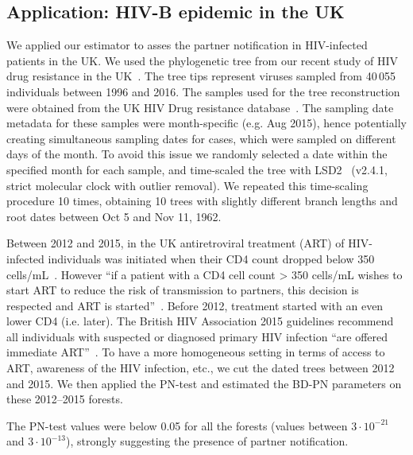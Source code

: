 \documentclass[a4paper,10pt]{article}
\begin{document}
\subsection{Application: HIV-B epidemic in the UK}
We applied our estimator to asses the partner notification in HIV-infected patients in the UK. We used the phylogenetic tree from our recent study of HIV drug resistance in the UK~\citep{zhukovaModelingDrugResistance2023}. The tree tips represent viruses sampled from 40\,055 individuals between 1996 and 2016. The samples used for the tree reconstruction were obtained from the UK HIV Drug resistance database~\citep{Dunn2007}. The sampling date metadata for these samples were month-specific (e.g. Aug 2015), hence potentially creating simultaneous sampling dates for cases, which were sampled on different days of the month. To avoid this issue we randomly selected a date within the specified month for each sample, and time-scaled the tree with LSD2~\citep{To2016} (v2.4.1, strict molecular clock with outlier removal). We repeated this time-scaling procedure 10 times, obtaining 10 trees with slightly different branch lengths and root dates between Oct 5 and Nov 11, 1962.

Between 2012 and 2015, in the UK antiretroviral treatment (ART) of HIV-infected individuals  was initiated when their CD4 count dropped below 350 cells/mL~\citep{williamsBritishHIVAssociation2012}. However ``if a patient with a CD4 cell count > 350 cells/mL wishes to start ART to reduce the risk of transmission to partners, this decision is respected and ART is started''~\citep{williamsBritishHIVAssociation2012}. Before 2012, treatment started with an even lower CD4 (i.e. later). The British HIV Association 2015 guidelines recommend all individuals with suspected or diagnosed primary HIV infection ``are offered immediate ART''~\citep{churchillBritishHIVAssociation2016}. To have a more homogeneous setting in terms of access to ART, awareness of the HIV infection, etc., we cut the dated trees between 2012 and 2015. We then applied the PN-test and estimated the BD-PN parameters on these 2012--2015 forests. 

The PN-test values were below 0.05 for all the forests (values between $3 \cdot 10^{-21}$ and $3 \cdot 10^{-13}$), strongly suggesting the presence of partner notification.
\end{document}
